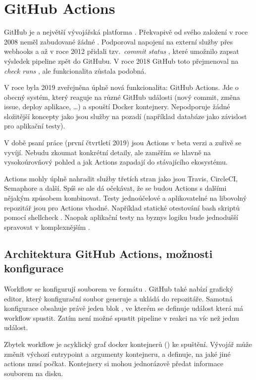 \section{GitHub Actions}
    GitHub je  a největší vývojářská platforma \cite{github-about}. Překvapivě od svého založení v roce 2008 neměl zabudované žádné \CI. Podporoval napojení na externí služby přes webhooks a až v roce 2012 přidali tzv.~\textit{commit status }, které umožnilo \CI zapsat výsledek pipeline zpět do GitHubu. V roce 2018 GitHub toto přejmenoval na \textit{check runs }, ale funkcionalita zůstala podobná.

    V roce byla 2019 zveřejněna úplně nová funkcionalita: GitHub Actions. Jde o obecný systém, který reaguje na různé GitHub události (nový commit, změna issue, deploy aplikace, \ldots) a spouští Docker kontejnery. Nepodporuje žádné složitější koncepty jako jsou služby na pozadí (například databáze jako závislost pro aplikační testy).

    V době psaní práce (první čtvrtletí 2019) jsou Actions v beta verzi a zuřivě se vyvíjí. Nebudu zkoumat konkrétní detaily, ale zaměřím se hlavně na vysokoúrovňový pohled a jak Actions zapadají do stávajícího ekosystému.

    Actions mohly úplně nahradit služby třetích stran jako jsou Travis, CircleCI, Semaphore a další. Spíš se ale dá očekávat, že se budou Actions s dalšími \CI nějakým způsobem kombinovat. Testy jednoúčelové a aplikovatelné na libovolný repozitář jsou pro Actions vhodné. Například statické otestování bash skriptů pomocí shellcheck \cite{ga-shellcheck}. Naopak aplikační testy na byznys logiku bude jednodušší spravovat v komplexnějším \CI.

    \subsection{Architektura GitHub Actions, možnosti konfigurace}
        Workflow se konfigurují souborem  ve formátu . GitHub také nabízí grafický editor, který konfigurační soubor generuje a ukládá do repozitáře. Samotná konfigurace obsahuje právě jeden blok , ve kterém se definuje  událost která má workflow spustit. Zatím není možné spustit pipeline v reakci na víc než jednu událost.

        Zbytek workflow je acyklický graf docker kontejnerů () ke spuštění. Vývojář může změnit výchozí entrypoint a argumenty kontejneru, a definuje, na jaké jiné actions musí počkat. Kontejnery si mohou jednorázově předat informace souborem na disku. 

